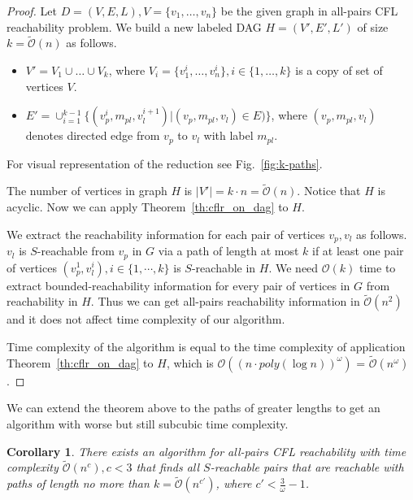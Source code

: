 \documentclass[12pt]{article}
\newtheorem{cor}{Corollary}[section]
\begin{document}
\begin{proof}
Let $D = (V, E, L), V = \{v_1, \ldots, v_n\}$ be the given graph in all-pairs CFL reachability problem. We build a new labeled DAG $H = (V', E', L')$ of size $k = \tilde{\mathcal{O}}(n)$ as follows.

\begin{itemize}
    \item $V' = V_1 \cup \ldots \cup V_k$, where $V_i = \{v^i_1, \ldots, v^i_n\}, i \in \{1, \ldots, k\}$ is a copy of set of vertices $V$.
    \item $E' = \cup_{i = 1}^{k - 1} \{(v^i_p, m_{pl}, v^{i+1}_l)|(v_p, m_{pl}, v_l) \in E)\}$, where $(v_p, m_{pl}, v_l)$ denotes directed edge from $v_p$ to $v_l$ with label $m_{pl}$.
\end{itemize}

For visual representation of the reduction see Fig.~\ref{fig:k-paths}.

The number of vertices in graph $H$ is $|V'| = k \cdot n = \tilde{\mathcal{O}}(n)$. Notice that $H$ is acyclic. Now we can apply Theorem~\ref{th:cflr_on_dag} to $H$.  

We extract the reachability information for each pair of vertices $v_p, v_l$ as follows. $v_l$ is $S$-reachable from $v_p$ in $G$ via a path of length at most $k$ if at least one pair of vertices $(v_p^1, v_l^i), i \in \{1, \cdots, k\}$ is $S$-reachable in $H$. We need $\mathcal{O}(k)$ time to extract bounded-reachability information for every pair of vertices in $G$ from reachability in $H$. Thus we can get all-pairs reachability information in $\tilde{\mathcal{O}}(n^2)$ and it does not affect time complexity of our algorithm.

Time complexity of the algorithm is equal to the time complexity of application Theorem~\ref{th:cflr_on_dag} to $H$, which is $\mathcal{O}((n \cdot poly(\log n))^{\omega})$ = $\tilde{\mathcal{O}}(n^{\omega})$.
\end{proof}

We can extend the theorem above to the paths of greater lengths to get an algorithm with worse but still subcubic time complexity.

\begin{cor}\label{cor:paths}
There exists an algorithm for all-pairs CFL reachability with time complexity $\tilde{\mathcal{O}}(n^c), c < 3$ that finds all $S$-reachable pairs that are reachable with paths of length no more than $k = \tilde{\mathcal{O}}(n^{c'})$, where $c' < \frac{3}{\omega} - 1$.
\end{cor}
\end{document}
